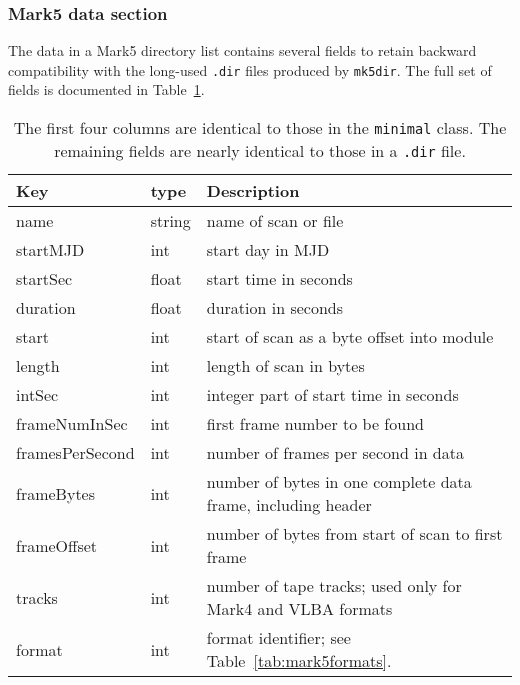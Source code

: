 \documentclass[12pt]{article}
\begin{document}
\subsubsection{Mark5 data section}

The data in a Mark5 directory list contains several fields to retain backward compatibility with the long-used {\tt .dir} files produced by {\tt mk5dir}.
The full set of fields is documented in Table~\ref{tab:mark5data}.

\begin{table}[h]
\begin{tabularx}{\textwidth}{llX}
\hline
Key & type & Description \\
\hline
name & string & name of scan or file \\
startMJD & int & start day in MJD \\
startSec & float & start time in seconds \\
duration & float & duration in seconds \\
start & int & start of scan as a byte offset into module \\
length & int & length of scan in bytes \\
intSec & int & integer part of start time in seconds \\
frameNumInSec & int & first frame number to be found \\
framesPerSecond & int & number of frames per second in data \\
frameBytes & int & number of bytes in one complete data frame, including header \\
frameOffset & int & number of bytes from start of scan to first frame \\
tracks & int & number of tape tracks; used only for Mark4 and VLBA formats \\
format & int & format identifier; see Table~\ref{tab:mark5formats}. \\
\hline
\hline
\end{tabularx}
\caption{\label{tab:mark5data}
The first four columns are identical to those in the {\tt minimal} class.
The remaining fields are nearly identical to those in a {\tt .dir} file.
}
\end{table}
\end{document}
